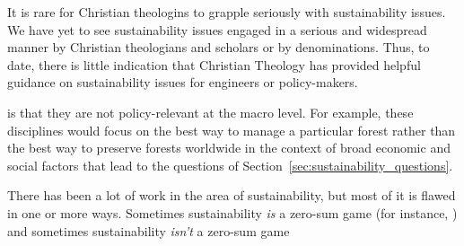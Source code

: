 \documentclass[12pt]{article}
\begin{document}
It is rare for Christian theologins to grapple seriously with 
sustainability issues.
We have yet to see sustainability issues engaged in a serious and widespread manner
by Christian theologians and scholars or by denominations.
Thus, to date, there is little indication that Christian Theology 
has provided helpful guidance on sustainability issues
for engineers or policy-makers.








is that they are not policy-relevant
at the macro level. 
For example, these disciplines would focus on the best way to manage a particular forest 
rather than the best way to preserve forests worldwide
in the context of broad economic and social factors
that lead to the questions of Section~\ref{sec:sustainability_questions}.

There has been a lot of work in the area of sustainability, but most of it is flawed in one or more ways.
Sometimes sustainability \emph{is} a zero-sum game 
(for instance, )
and sometimes sustainability \emph{isn't} a zero-sum game 



\printbibliography
\end{document}
